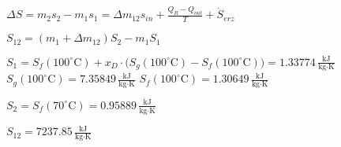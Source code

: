 \( \Delta S = m_2 s_2 - m_1 s_1 = \Delta m_{12} s_{in} + \frac{Q_R - Q_{out}}{T} + \dot{S}_{erz} \)  

\( S_{12} = (m_1 + \Delta m_{12}) S_2 - m_1 S_1 \)  

\( S_1 = S_f (100^\circ \text{C}) + x_D \cdot \big(S_g (100^\circ \text{C}) - S_f (100^\circ \text{C})\big) = 1.33774 \, \frac{\text{kJ}}{\text{kg·K}} \)  
\( S_g (100^\circ \text{C}) = 7.35849 \, \frac{\text{kJ}}{\text{kg·K}} \)  
\( S_f (100^\circ \text{C}) = 1.30649 \, \frac{\text{kJ}}{\text{kg·K}} \)  

\( S_2 = S_f (70^\circ \text{C}) = 0.95889 \, \frac{\text{kJ}}{\text{kg·K}} \)  

\( S_{12} = 7237.85 \, \frac{\text{kJ}}{\text{kg·K}} \)